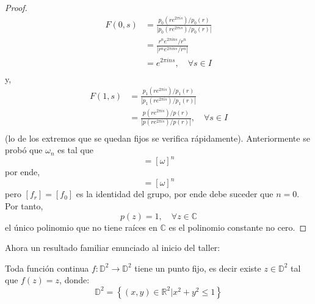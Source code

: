 \documentclass[12pt]{report}
\theoremstyle{largebreak}
\newcommand\abs[1]{\ensuremath{\left|#1\right|}}
\newcommand\cf[3]{\ensuremath{#1:#2\rightarrow#3}}
\begin{document}
\begin{proof}
\begin{equation*}
\begin{split}
                F(0,s)&=\frac{p_0(re^{ 2\pi is})/p_0(r)}{\abs{p_0(re^{ 2\pi is})/p_0(r)}}\\
                &=\frac{r^n e^{ 2\pi ins}/r^n}{\abs{r^n e^{ 2\pi ins}/r^n}}\\
                &=e^{ 2\pi ins},\quad\forall s\in I \\
            \end{split}
        \end{equation*}
        y,
        \begin{equation*}
            \begin{split}
                F(1,s)&=\frac{p_1(re^{ 2\pi is})/p_1(r)}{\abs{p_1(re^{ 2\pi is})/p_1(r)}}\\
                &=\frac{p(re^{ 2\pi is})/p(r)}{\abs{p(re^{ 2\pi is})/p(r)}},\quad\forall s\in I\\
            \end{split}
        \end{equation*}
        (lo de los extremos que se quedan fijos se verifica rápidamente). Anteriormente se probó que $\omega_n$ es tal que
        \begin{equation*}
            [\omega_n]=[\omega]^n
        \end{equation*}
        por ende,
        \begin{equation*}
            [f_r]=[\omega]^n
        \end{equation*}
        pero $[f_r]=[f_0]$ es la identidad del grupo, por ende debe suceder que $n=0$. Por tanto,
        \begin{equation*}
            p(z)=1,\quad\forall z\in\mathbb{C}
        \end{equation*}
        el único polinomio que no tiene raíces en $\mathbb{C}$ es el polinomio constante no cero.
    \end{proof}

    Ahora un resultado familiar enunciado al inicio del taller:

    \begin{theor}
        Toda función continua $\cf{f}{\mathbb{D}^2}{\mathbb{D}^2}$ tiene un punto fijo, es decir existe $z\in\mathbb{D}^2$ tal que $f(z)=z$, donde:
        \begin{equation*}
            \mathbb{D}^2=\left\{(x,y)\in\mathbb{R}^2\Big|x^2+y^2\leq1 \right\}
        \end{equation*}
    \end{theor}
\end{document}
